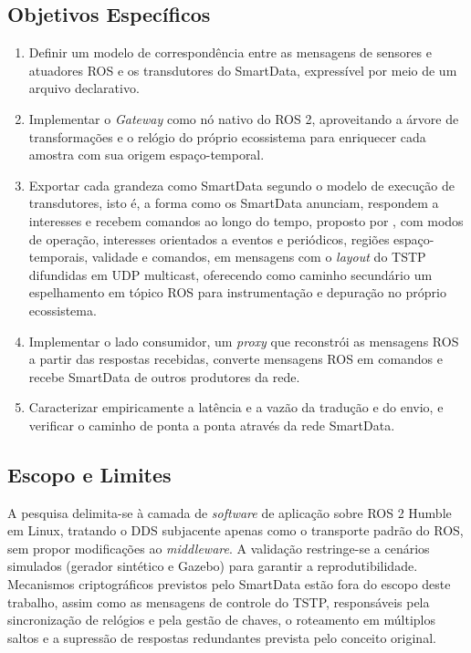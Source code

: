 \documentclass[
    12pt,
    oneside,
    a4paper,
    chapter=TITLE,
    section=TITLE,
    english,
    brazil
]{abntex2}
\begin{document}
\subsection{Objetivos Específicos}
\begin{enumerate}
    \item Definir um modelo de correspondência entre as mensagens de
    sensores e atuadores ROS e os transdutores do SmartData, expressível
    por meio de um arquivo declarativo.
    \item Implementar o \textit{Gateway} como nó nativo do ROS 2,
    aproveitando a árvore de transformações e o relógio do próprio
    ecossistema para enriquecer cada amostra com sua origem espaço-temporal.
    \item Exportar cada grandeza como SmartData segundo o modelo de
    execução de transdutores, isto é, a forma como os SmartData anunciam,
    respondem a interesses e recebem comandos ao longo do tempo, proposto
    por , com
    modos de operação, interesses orientados a eventos e periódicos,
    regiões espaço-temporais, validade e comandos, em mensagens com o
    \textit{layout} do TSTP difundidas em UDP multicast, oferecendo como
    caminho secundário um espelhamento em tópico ROS para instrumentação
    e depuração no próprio ecossistema.
    \item Implementar o lado consumidor, um \textit{proxy} que reconstrói
    as mensagens ROS a partir das respostas recebidas, converte mensagens
    ROS em comandos e recebe SmartData de outros produtores da rede.
    \item Caracterizar empiricamente a latência e a vazão da tradução e
    do envio, e verificar o caminho de ponta a ponta através da rede
    SmartData.
\end{enumerate}

\subsection{Escopo e Limites}
A pesquisa delimita-se à camada de \textit{software} de aplicação sobre
ROS 2 Humble em Linux, tratando o DDS subjacente apenas como o transporte
padrão do ROS, sem propor modificações ao \textit{middleware}. A validação
restringe-se a cenários simulados (gerador sintético e Gazebo) para garantir a
reprodutibilidade. Mecanismos criptográficos previstos pelo SmartData
estão fora do escopo deste trabalho, assim como as mensagens de controle
do TSTP, responsáveis pela sincronização de relógios e pela gestão de
chaves, o roteamento em múltiplos saltos e a supressão de respostas
redundantes prevista pelo conceito original.
\end{document}

